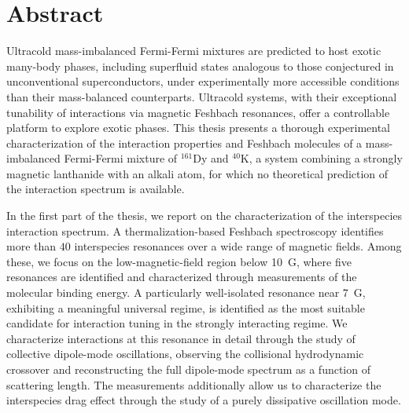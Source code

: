 \begingroup
\let\clearpage\relax
\let\cleardoublepage\relax
\let\cleardoublepage\relax

\chapter*{Abstract}

Ultracold mass-imbalanced Fermi-Fermi mixtures are predicted to host exotic many-body phases, including superfluid states analogous to those conjectured in unconventional superconductors, under experimentally more accessible conditions than their mass-balanced counterparts. Ultracold systems, with their exceptional tunability of interactions via magnetic Feshbach resonances, offer a controllable platform to explore exotic phases. This thesis presents a thorough experimental characterization of the interaction properties and Feshbach molecules of a mass-imbalanced Fermi-Fermi mixture of $^{161}$Dy and $^{40}$K, a system combining a strongly magnetic lanthanide with an alkali atom, for which no theoretical prediction of the interaction spectrum is available.

In the first part of the thesis, we report on the characterization of the interspecies interaction spectrum. A thermalization-based Feshbach spectroscopy identifies more than $40$ interspecies resonances over a wide range of magnetic fields. Among these, we focus on the low-magnetic-field region below \SI{10}{G}, where five resonances are identified and characterized through measurements of the molecular binding energy. A particularly well-isolated resonance near \SI{7}{G}, exhibiting a meaningful universal regime, is identified as the most suitable candidate for interaction tuning in the strongly interacting regime. We characterize interactions at this resonance in detail through the study of collective dipole-mode oscillations, observing the collisional hydrodynamic crossover and reconstructing the full dipole-mode spectrum as a function of scattering length. The measurements additionally allow us to characterize the interspecies drag effect through the study of a purely dissipative oscillation mode.

